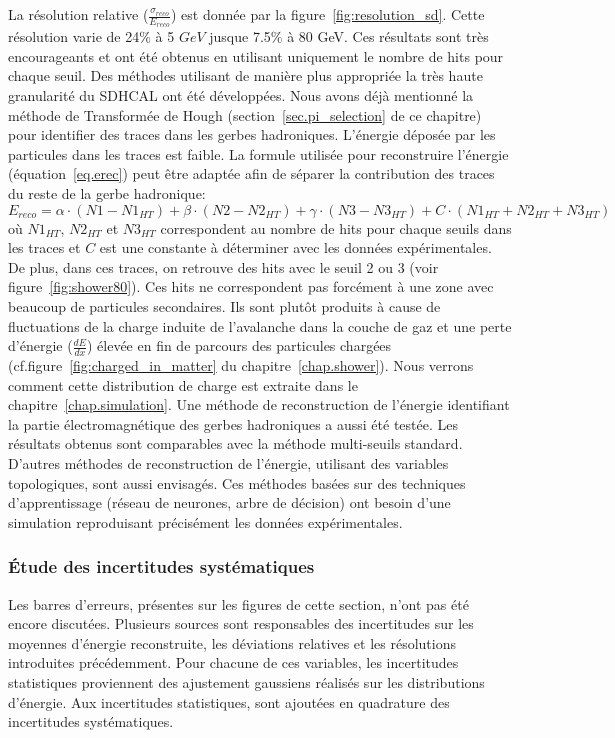 La résolution relative ($\frac{\sigma_{reco}}{E_{reco}}$) est donnée par la figure~\ref{fig:resolution_sd}. Cette résolution varie de 24$\%$ à 5 $GeV$ jusque 7.5$\%$ à 80 GeV. Ces résultats sont très encourageants et ont été obtenus en utilisant uniquement le nombre de hits pour chaque seuil. Des méthodes utilisant de manière plus appropriée la très haute granularité du SDHCAL ont été développées. Nous avons déjà mentionné la méthode de Transformée de Hough (section~\ref{sec.pi_selection} de ce chapitre) pour identifier des traces dans les gerbes hadroniques. L'énergie déposée par les particules dans les traces est faible. La formule utilisée pour reconstruire l'énergie (équation~\ref{eq.erec}) peut être adaptée afin de séparer la contribution des traces du reste de la gerbe hadronique:
\begin{equation}
  E_{reco}=\alpha\cdot (N1-N1_{HT})+\beta\cdot (N2-N2_{HT})+\gamma\cdot (N3-N3_{HT}) + C\cdot(N1_{HT}+N2_{HT}+N3_{HT}) 
  \label{eq.erec_ht}
\end{equation}
où $N1_{HT}$, $N2_{HT}$ et $N3_{HT}$ correspondent au nombre de hits pour chaque seuils dans les traces et $C$ est une constante à déterminer avec les données expérimentales. De plus, dans ces traces, on retrouve des hits avec le seuil 2 ou 3 (voir figure~\ref{fig:shower80}). Ces hits ne correspondent pas forcément à une zone avec beaucoup de particules secondaires. Ils sont plutôt produits à cause de fluctuations de la charge induite de l'avalanche dans la couche de gaz et une perte d'énergie ($\frac{dE}{dx}$) élevée en fin de parcours des particules chargées (cf.figure~\ref{fig:charged_in_matter} du chapitre~\ref{chap.shower}). Nous verrons comment cette distribution de charge est extraite dans le chapitre~\ref{chap.simulation}. Une méthode de reconstruction de l'énergie identifiant la partie électromagnétique des gerbes hadroniques a aussi été testée. Les résultats obtenus sont comparables avec la méthode multi-seuils standard. D'autres méthodes de reconstruction de l'énergie, utilisant des variables topologiques, sont aussi envisagés. Ces méthodes basées sur des techniques d'apprentissage (réseau de neurones, arbre de décision) ont besoin d'une simulation reproduisant précisément les données expérimentales. 

\subsubsection{Étude des incertitudes systématiques}
Les barres d'erreurs, présentes sur les figures de cette section, n'ont pas été encore discutées. Plusieurs sources sont responsables des incertitudes sur les moyennes d'énergie reconstruite, les déviations relatives et les résolutions introduites précédemment. Pour chacune de ces variables, les incertitudes statistiques proviennent des ajustement gaussiens réalisés sur les distributions d’énergie. Aux incertitudes statistiques, sont ajoutées en quadrature des incertitudes systématiques. 

